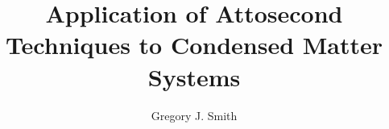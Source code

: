 \documentclass[11pt, onehalf, phd]{osudiss-2}
\title{Application of Attosecond Techniques to Condensed Matter Systems}
\author{Gregory J. Smith}
\newcommand\PrintListofAbbreviations[1]{
\phantomsection
\addcontentsline{toc}{front}{\typesetColumnHeading{#1}}
\printglossary[type=\acronymtype,title={\protect {\typesetLevelTwo{#1}}}]
}
\begin{document}
\frontmatter


\dedication{Dedicated to my family.} %


\tableofcontents

\clearpage %
\listoffigures

\clearpage  %
\listoftables 

\clearpage %

\mainmatter


%
%
%
% 

\backmatter


%
%
\end{document}
